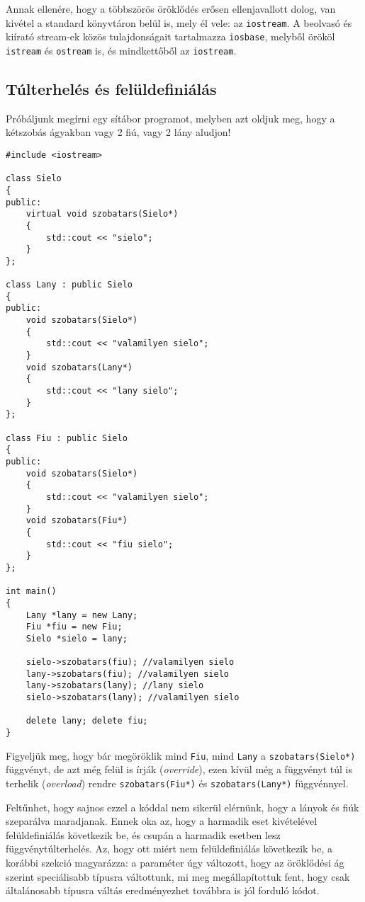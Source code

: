 \documentclass[a4paper,11.5pt]{article}
\begin{document}
	Annak ellenére, hogy a többszörös öröklődés erősen ellenjavallott dolog, van kivétel a standard könyvtáron belül is, mely él vele: az \texttt{iostream}. A beolvasó és kiírató stream-ek közös tulajdonságait tartalmazza \texttt{iosbase}, melyből örököl \texttt{istream} és \texttt{ostream} is, és mindkettőből az \texttt{iostream}.
	\subsection{Túlterhelés és felüldefiniálás}
	Próbáljunk megírni egy sítábor programot, melyben azt oldjuk meg, hogy a kétszobás ágyakban vagy 2 fiú, vagy 2 lány aludjon!
\begin{lstlisting}
#include <iostream>

class Sielo
{
public:
	virtual void szobatars(Sielo*)
	{
		std::cout << "sielo";
	}
};

class Lany : public Sielo
{
public:
	void szobatars(Sielo*)
	{
		std::cout << "valamilyen sielo";
	}
	void szobatars(Lany*)
	{
		std::cout << "lany sielo";
	}
};

class Fiu : public Sielo
{
public:
	void szobatars(Sielo*)
	{
		std::cout << "valamilyen sielo";
	}
	void szobatars(Fiu*)
	{
		std::cout << "fiu sielo";
	}
};

int main()
{
	Lany *lany = new Lany;
	Fiu *fiu = new Fiu;
	Sielo *sielo = lany;
	
	sielo->szobatars(fiu); //valamilyen sielo
	lany->szobatars(fiu); //valamilyen sielo
	lany->szobatars(lany); //lany sielo
	sielo->szobatars(lany); //valamilyen sielo
	
	delete lany; delete fiu;
}
\end{lstlisting}
	Figyeljük meg, hogy bár megöröklik mind \texttt{Fiu}, mind \texttt{Lany} a \texttt{szobatars(Sielo*)} függvényt, de azt még felül is írják (\textit{override}), ezen kívül még a függvényt túl is terhelik (\textit{overload}) rendre \texttt{szobatars(Fiu*)} és \texttt{szobatars(Lany*)} függvénnyel. 
	
	Feltűnhet, hogy sajnos ezzel a kóddal nem sikerül elérnünk, hogy a lányok és fiúk szeparálva maradjanak. Ennek oka az, hogy a harmadik eset kivételével felüldefiniálás következik be, és csupán a harmadik esetben lesz függvénytúlterhelés. Az, hogy ott miért nem felüldefiniálás következik be, a korábbi szekció magyarázza: a paraméter úgy változott, hogy az öröklődési ág szerint speciálisabb típusra váltottunk, mi meg megállapítottuk fent, hogy csak általánosabb típusra váltás eredményezhet továbbra is jól forduló kódot.
	
\end{document}

